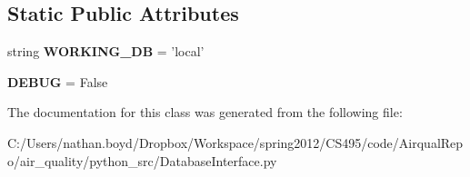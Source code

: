 \subsection*{Static Public Attributes}
\begin{DoxyCompactItemize}
\item 
\hypertarget{class_database_interface_1_1_database_interface_ac0a2837d86558a1bfe62834dcd6274f3}{string {\bfseries W\-O\-R\-K\-I\-N\-G\-\_\-\-D\-B} = 'local'}\label{class_database_interface_1_1_database_interface_ac0a2837d86558a1bfe62834dcd6274f3}

\item 
\hypertarget{class_database_interface_1_1_database_interface_ae92289621f90ec296eb0cd89b9f6fc91}{{\bfseries D\-E\-B\-U\-G} = False}\label{class_database_interface_1_1_database_interface_ae92289621f90ec296eb0cd89b9f6fc91}

\end{DoxyCompactItemize}


The documentation for this class was generated from the following file\-:\begin{DoxyCompactItemize}
\item 
C\-:/\-Users/nathan.\-boyd/\-Dropbox/\-Workspace/spring2012/\-C\-S495/code/\-Airqual\-Repo/air\-\_\-quality/python\-\_\-src/Database\-Interface.\-py\end{DoxyCompactItemize}

